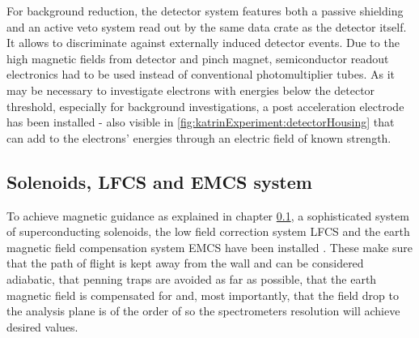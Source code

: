       
      For background reduction, the detector system features both a passive shielding and an active veto system read out by the same data crate as the detector itself. It allows to discriminate against externally induced detector events. Due to the high magnetic fields from detector and pinch magnet, semiconductor readout electronics had to be used instead of conventional photomultiplier tubes.
      As it may be necessary to investigate electrons with energies below the detector threshold, especially for background investigations, a post acceleration electrode has been installed - also visible in \ref{fig:katrinExperiment:detectorHousing} that can add to the electrons' energies through an electric field of known strength.
      
      \subsection{Solenoids, LFCS and EMCS system}
      \label{ch:The KATRIN experiment:sec:Experimental setup:subsec:Solenoids, LFCS and EMCS system}
      
      To achieve magnetic guidance as explained in chapter \ref{ch:The KATRIN experiment:sec:Experimental setup:subsec:Solenoids, LFCS and EMCS system}, a sophisticated system of superconducting solenoids, the low field correction system LFCS and the earth magnetic field compensation system EMCS have been installed \cite{airCoilSystem}. These make sure that the path of flight is kept away from the wall and can be considered adiabatic, that penning traps are avoided as far as possible, that the earth magnetic field is compensated for and, most importantly, that the field drop to the analysis plane is of the order of  so the spectrometers resolution will achieve desired values.
      

